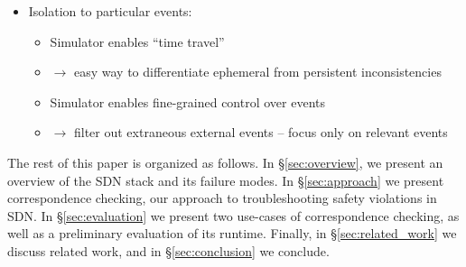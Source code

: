 \begin{itemize}
\begin{itemize}
\begin{itemize}
        \end{itemize}
    \item Isolation to particular events:
        \begin{itemize}
        \item Simulator enables ``time travel''
        \item $\rightarrow$ easy way to differentiate ephemeral from persistent inconsistencies
        \item Simulator enables fine-grained control over events
        \item $\rightarrow$ filter out extraneous external events -- focus only on relevant
        events
        \end{itemize}
    \end{itemize}
\end{itemize}

The rest of this paper is organized as follows. In \S\ref{sec:overview},
we present an overview of the SDN stack and its failure modes.
In \S\ref{sec:approach} we present correspondence checking, our approach to
troubleshooting safety violations in SDN. In \S\ref{sec:evaluation} we present
two use-cases of correspondence checking, as well as a preliminary evaluation
of its runtime. Finally, in \S\ref{sec:related_work} we discuss related work,
and in \S\ref{sec:conclusion} we conclude.
